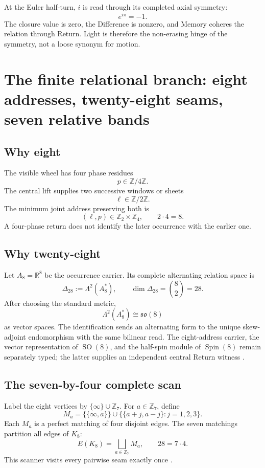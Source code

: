 \documentclass[11pt]{article}
\newcommand{\R}{\mathbb R}
\newcommand{\Z}{\mathbb Z}
\newcommand{\SO}{\operatorname{SO}}
\newcommand{\Spin}{\operatorname{Spin}}
\begin{document}
At the Euler half-turn, $i$ is read through its completed axial symmetry:
\[
e^{i\pi}=-1.
\]
The closure value is zero, the Difference is nonzero, and Memory coheres the relation through Return. Light is therefore the non-erasing hinge of the symmetry, not a loose synonym for motion.

\section{The finite relational branch: eight addresses, twenty-eight seams, seven relative bands}

\subsection{Why eight}

The visible wheel has four phase residues
\[
p\in\Z/4\Z.
\]
The central lift supplies two successive windows or sheets
\[
\ell\in\Z/2\Z.
\]
The minimum joint address preserving both is
\[
\boxed{(\ell,p)\in\Z_2\times\Z_4,\qquad 2\cdot4=8.}
\]
A four-phase return does not identify the later occurrence with the earlier one.

\subsection{Why twenty-eight}

Let $A_8=\R^8$ be the occurrence carrier. Its complete alternating relation space is
\[
\Delta_{28}:=\Lambda^2(A_8^*),
\qquad
\boxed{\dim\Delta_{28}=\binom82=28.}
\]
After choosing the standard metric,
\[
\Lambda^2(A_8^*)\cong\mathfrak{so}(8)
\]
as vector spaces. The identification sends an alternating form to the unique skew-adjoint endomorphism with the same bilinear read. The eight-address carrier, the vector representation of $\SO(8)$, and the half-spin module of $\Spin(8)$ remain separately typed; the latter supplies an independent central Return witness \cite{CoppaArchitectureSilence2026}.

\subsection{The seven-by-four complete scan}

Label the eight vertices by $\{\infty\}\cup\Z_7$. For $a\in\Z_7$, define
\[
M_a=\{\{\infty,a\}\}\cup\{\{a+j,a-j\}:j=1,2,3\}.
\]
Each $M_a$ is a perfect matching of four disjoint edges. The seven matchings partition all edges of $K_8$:
\[
\boxed{E(K_8)=\bigsqcup_{a\in\Z_7}M_a,
\qquad
28=7\cdot4.}
\]
This scanner visits every pairwise seam exactly once \cite{CoppaMinimumEndurance2026,CoppaArchitectureSilence2026}.
\end{document}
